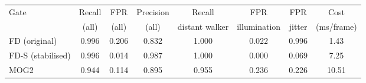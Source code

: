 \begin{tabular}{@{}lccccccc@{}}
\toprule
Gate & Recall & FPR & Precision & Recall & FPR & FPR & Cost \\
 & (all) & (all) & (all) & distant walker & illumination & jitter & (ms/frame) \\
\midrule
FD (original) & 0.996 & 0.206 & 0.832 & 1.000 & 0.022 & 0.996 & 1.43 \\
FD-S (stabilised) & 0.996 & 0.014 & 0.987 & 1.000 & 0.000 & 0.069 & 7.25 \\
MOG2 & 0.944 & 0.114 & 0.895 & 0.955 & 0.236 & 0.226 & 10.51 \\
\bottomrule
\end{tabular}
